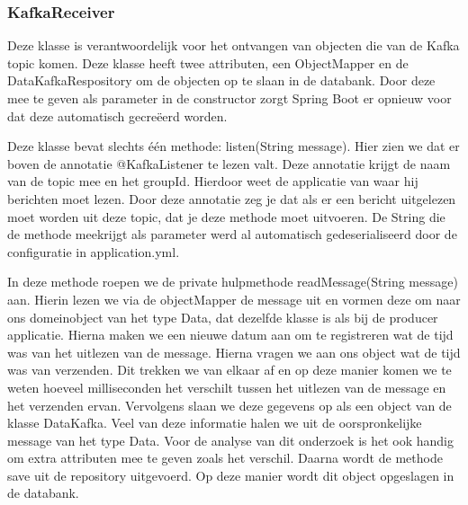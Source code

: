 \subsubsection{KafkaReceiver}
Deze klasse is verantwoordelijk voor het ontvangen van objecten die van de Kafka topic komen. Deze klasse heeft twee attributen, een ObjectMapper en de DataKafkaRespository om de objecten op te slaan in de databank. Door deze mee te geven als parameter in de constructor zorgt Spring Boot er opnieuw voor dat deze automatisch gecreëerd worden.

Deze klasse bevat slechts één methode: listen(String message). Hier zien we dat er boven de annotatie @KafkaListener te lezen valt. Deze annotatie krijgt de naam van de topic mee en het groupId. Hierdoor weet de applicatie van waar hij berichten moet lezen. Door deze annotatie zeg je dat als er een bericht uitgelezen moet worden uit deze topic, dat je deze methode moet uitvoeren. De String die de methode meekrijgt als parameter werd al automatisch gedeserialiseerd door de configuratie in application.yml. 

In deze methode roepen we de private hulpmethode readMessage(String message) aan. Hierin lezen we via de objectMapper de message uit en vormen deze om naar ons domeinobject van het type Data, dat dezelfde klasse is als bij de producer applicatie. Hierna maken we een nieuwe datum aan om te registreren wat de tijd was van het uitlezen van de message. Hierna vragen we aan ons object wat de tijd was van verzenden. Dit trekken we van elkaar af en op deze manier komen we te weten hoeveel milliseconden het verschilt tussen het uitlezen van de message en het verzenden ervan. Vervolgens slaan we deze gegevens op als een object van de klasse DataKafka. Veel van deze informatie halen we uit de oorspronkelijke message van het type Data. Voor de analyse van dit onderzoek is het ook handig om extra attributen mee te geven zoals het verschil. Daarna wordt de methode save uit de repository uitgevoerd. Op deze manier wordt dit object opgeslagen in de databank.

